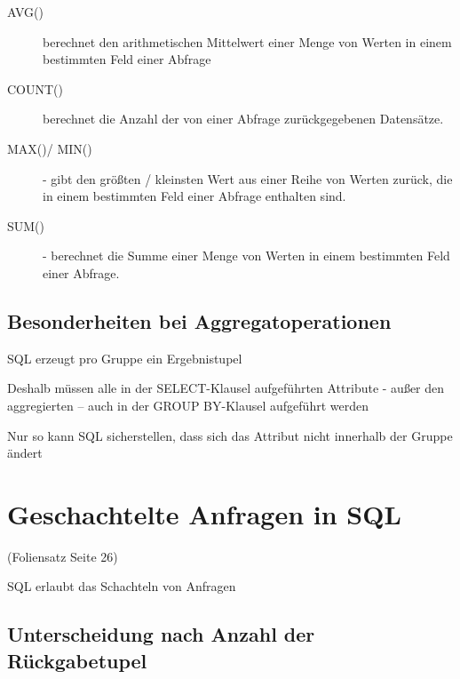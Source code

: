 \documentclass{lehramt-informatik-haupt}
\begin{document}
\begin{description}
\item[AVG()] berechnet den arithmetischen Mittelwert einer Menge von
Werten in einem bestimmten Feld einer Abfrage

\item[COUNT()] berechnet die Anzahl der von einer Abfrage
zurückgegebenen Datensätze.

\item[MAX()/ MIN()] - gibt den größten / kleinsten Wert aus einer Reihe
von Werten zurück, die in einem bestimmten Feld einer Abfrage enthalten
sind.

\item[SUM()] - berechnet die Summe einer Menge von Werten in einem
bestimmten Feld einer Abfrage.
\end{description}

\subsection{Besonderheiten bei Aggregatoperationen}

\begin{compactitem}
\item SQL erzeugt pro Gruppe ein Ergebnistupel

\item Deshalb müssen alle in der SELECT-Klausel aufgeführten Attribute -
außer den aggregierten – auch in der GROUP BY-Klausel aufgeführt werden

\item Nur so kann SQL sicherstellen, dass sich das Attribut nicht
innerhalb der Gruppe ändert
\end{compactitem}

%

\section{Geschachtelte Anfragen in SQL}

(Foliensatz Seite 26)

SQL erlaubt das Schachteln von Anfragen

%

\subsection{Unterscheidung nach Anzahl der Rückgabetupel}
\end{document}
